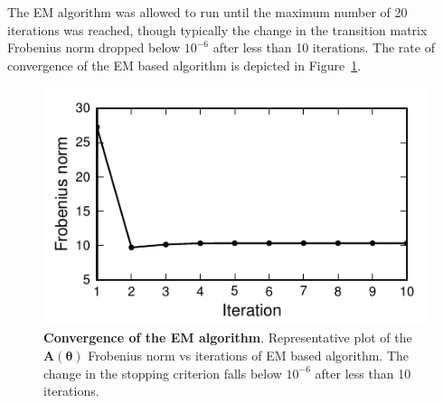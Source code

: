\documentclass[11pt,draftcls,onecolumn,peerreview]{IEEEtran}
\begin{document}
The EM algorithm was allowed to run until the maximum number of 20 iterations was reached, though typically the change in the transition matrix Frobenius norm dropped below $10^{-6}$ after less than 10 iterations. The rate of convergence of the EM based algorithm is depicted in Figure~\ref{fig:MRA-Convergence}. 
\begin{figure}[!h] 
 	\centering
 		\includegraphics[scale=1]{./Graph/ConvergenceRate.pdf}
 		\caption{{\bf Convergence of the EM algorithm}. Representative plot of
the $\mathbf A(\boldsymbol\theta)$ Frobenius norm vs iterations of EM based algorithm. The change in the stopping criterion falls below $10^{-6}$ after less than 10 iterations.}
 	\label{fig:MRA-Convergence}
 \end{figure}     
\end{document}
